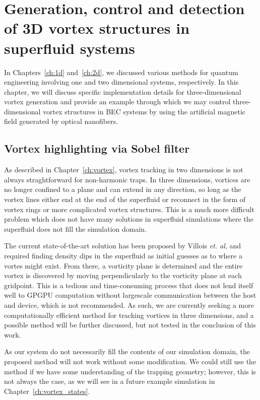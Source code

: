 \chapter{Generation, control and detection of 3D vortex structures in superfluid systems}
\label{ch:3d}

In Chapters~\ref{ch:1d} and~\ref{ch:2d}, we discussed various methods for quantum engineering involving one and two dimensional systems, respectively.
In this chapter, we will discuss specific implementation details for three-dimensional vortex generation and provide an example through which we may control three-dimensional vortex structures in BEC systems by using the artificial magnetic field generated by optical nanofibers.

\section{Vortex highlighting via Sobel filter}

As described in Chapter~\ref{ch:vortex}, vortex tracking in two dimensions is not always straghtforward for non-harmonic traps.
In three dimensions, vortices are no longer confined to a plane and can extend in any direction, so long as the vortex lines either end at the end of the superfluid or reconnect in the form of vortex rings or more complicated vortex structures.
This is a much more difficult problem which does not have many solutions in superfluid simulations where the superfluid does not fill the simulation domain.

The current state-of-the-art solution has been proposed by Villois \textit{et. al}, and required finding density dips in the superfluid as initial guesses as to where a vortes might exist.
From there, a vorticity plane is determined and the entire vortex is discovered by moving perpendicularly to the vorticity plane at each gridpoint.
This is a tedious and time-consuming process that does not lend itself well to GPGPU computation without largescale communication between the host and device, which is not recommended.
As such, we are currently seeking a more computationally efficient method for tracking vortices in three dimensions, and a possible method will be further discussed, but not tested in the conclusion of this work.

As our system do not necessarily fill the contents of our simulation domain, the proposed method will not work without some modification.
We could still use the method if we have some understanding of the trapping geometry; however, this is not always the case, as we will see in a future example simulation in Chapter~\ref{ch:vortex_states}.

